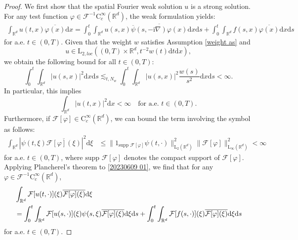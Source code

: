 \documentclass[11pt,reqno]{amsart}
\theoremstyle{definition}
\theoremstyle{remark}
\newcommand\bR{\mathbb{R}}
\newcommand\cF{\mathcal{F}}
\numberwithin{equation}{section}
\begin{document}
\begin{proof}
We first show that the spatial Fourier weak solution $u$ is a strong solution.
For any test function $\varphi \in \cF^{-1}\mathrm{C}_c^\infty(\bR^d)$, the weak formulation yields:
\begin{align} 
									\label{20230609 01} 
\int_{\bR^d} u(t,x) \overline{\varphi(x)} \mathrm{d}x =  \int_0^t \int_{\bR^d}u(s,x) \overline{ \overline{\psi}(s,-\mathrm{i}\nabla) \varphi(x)} \mathrm{d}x \mathrm{d}s + \int_0^t \int_{\bR^d} f(s,x)  \overline{\varphi(x)} \mathrm{d}x \mathrm{d}s 
\end{align}
for a.e. $t\in (0,T)$.
Given that the weight $w$ satisfies Assumption \ref{weight as} and
\[
u \in \mathrm{L}_{2, loc}\left( (0,T) \times \bR^d, t^{-2}w(t) \mathrm{d}t \mathrm{d}x \right),
\]
we obtain the following bound for all $t \in (0,T)$:
\[
\int_0^t \int_{\bR^d} | u(s,x)|^2 \mathrm{d}x \mathrm{d}s \lesssim_{t,N_w} \int_0^t \int_{\bR^d} | u(s,x)|^2 \frac{w(s)}{s^2} \mathrm{d}x \mathrm{d}s < \infty.
\]
In particular, this implies
\[
\int_{\bR^d} | u(t,x)|^2 \mathrm{d}x < \infty \quad \text{for a.e. } t \in (0,T).
\]
Furthermore, if $\cF[\varphi] \in \mathrm{C}_c^\infty(\bR^d)$, we can bound the term involving the symbol as follows:
\[
\begin{aligned} 
\int_{\bR^d} \left| \psi(t,\xi) \overline{\cF[\varphi](\xi)} \right|^2 \mathrm{d}\xi &\leq \|1_{\text{supp } \cF[\varphi]} \psi(t,\cdot)\|^2_{\mathrm{L}_2(\bR^d)} \|  \cF[\varphi] \|^2_{\mathrm{L}_{\infty}(\bR^d)} < \infty 
\end{aligned}
\]
for a.e. $t \in (0,T)$, where $\text{supp } \cF[\varphi]$ denotes the compact support of $\cF[\varphi]$.
Applying Plancherel's theorem to \eqref{20230609 01}, we find that for any $\varphi \in \cF^{-1}\mathrm{C}_c^\infty(\bR^d)$,
\begin{align} 
									\notag
&\int_{\bR^d} \cF[u(t,\cdot)](\xi) \overline{\cF[\varphi](\xi)} \mathrm{d}\xi  \\ 													\label{20230529 01} 
&= \int_0^t \int_{\bR^d} \cF[u(s,\cdot)](\xi) \psi(s,\xi) \overline{\cF[\varphi](\xi)} \mathrm{d}\xi \mathrm{d}s + \int_0^t \int_{\bR^d} \cF[f(s,\cdot)](\xi) \overline{\cF[\varphi](\xi)} \mathrm{d}\xi \mathrm{d}s 
\end{align}
for a.e. $t\in (0,T)$.






\end{proof}
\end{document}
